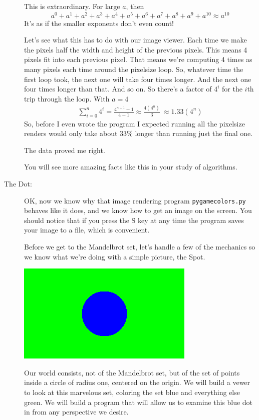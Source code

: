 \documentclass[12pt]{article}
\begin{document}
\begin{description}
This is extraordinary.  For large $a$, then
\[
a^0 + a^1 + a^2 + a^3 + a^4 + a^5 + a^6 + a^7 + a^8 + a^9 + a^{10} \approx a^{10}
\]
It's as if the smaller exponents don't even count!

Let's see what this has to do with our image viewer.
Each time we make the pixels half the width
and height of the previous pixels.  This means 
4 pixels fit into each previous pixel.  That
means we're computing 4 times as many pixels
each time around the pixelsize loop.  So, whatever
time the first loop took, the next one will take
four times longer.  And the next one four times longer than
that.  And so on.  So there's a factor of $4^i$
for the $i$th trip through the loop.  With $a=4$
\begin{align*}
\sum_{i=0}^{n} 4^i = \frac{4^{n+1} - 1}{4-1} 
 \approx \frac{4(4^n)}{3}\
 \approx 1.33(4^n)
\end{align*}
So, before I even wrote the program I expected
running all the pixelsize renders would only take
about 33\% longer than running just the final one.

The data proved me right.

You will see more amazing facts like this in your
study of algorithms.

\item[The Dot:] OK, now we know why that image rendering
program \lstinline{pygamecolors.py}
behaves like it does, and we know how to
get an image on the screen.  You should notice that
if you press the S key at any time the program
saves your image to a file, which is convenient.

Before we get to the Mandelbrot
set, let's handle a few of the mechanics so we
know what we're doing with a simple picture,
{\sc the Spot}.  

\centerline{\includegraphics[scale=0.5]{spot}}

Our world consists, not of the Mandelbrot set,
but of the set of points inside a circle of radius one, centered on the origin.
We will build a vewer to look at this marvelous
set, coloring the set blue and everything else 
green.  We will build a program
that will allow us to examine this blue dot
in from any perspective we desire.  



\end{description}
\end{document}
